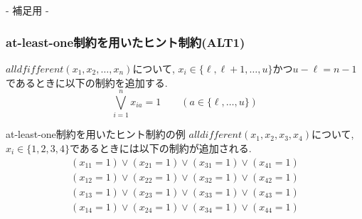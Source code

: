 



\appendix

\backupbegin

\begin{frame}
    \frametitle{~}
    \centering
    - 補足用 -
\end{frame}



\begin{frame}
    \frametitle{at-least-one制約を用いたヒント制約(ALT1)}
    \vspace{-3mm}
    \begin{block}{}
        $alldfifferent(x_1,x_2,\ldots,x_n)$について, $x_i \in \{\ell, \ell+1,\ldots, u\}$かつ$u-\ell=n-1$であるときに以下の制約を追加する.\\
        \vspace{-3mm}
        $$\bigvee_{i=1}^n x_{ia}=1 \qquad (a \in \{\ell,\ldots, u\})$$
    \end{block}
    \begin{exampleblock}{at-least-one制約を用いたヒント制約の例}
        $alldifferent(x_1, x_2, x_3, x_4)$について, $x_i \in \{1, 2, 3, 4\}$であるときには以下の制約が追加される.
        \vspace{-3mm}
        \begin{eqnarray*}
            (x_{11}=1) \lor (x_{21}=1) \lor (x_{31}=1) \lor (x_{41}=1)\\
            (x_{12}=1) \lor (x_{22}=1) \lor (x_{32}=1) \lor (x_{42}=1)\\
            (x_{13}=1) \lor (x_{23}=1) \lor (x_{33}=1) \lor (x_{43}=1)\\
            (x_{14}=1) \lor (x_{24}=1) \lor (x_{34}=1) \lor (x_{44}=1)
        \end{eqnarray*}
    \end{exampleblock}
\end{frame}


